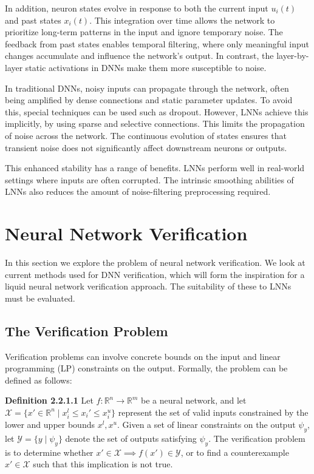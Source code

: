 In addition, neuron states evolve in response to both the current input \(u_i(t)\) and past states \(x_i(t)\). This integration over time allows the network to prioritize long-term patterns in the input and ignore temporary noise. The feedback from past states enables temporal filtering, where only meaningful input changes accumulate and influence the network’s output. In contrast, the layer-by-layer static activations in DNNs make them more susceptible to noise.

In traditional DNNs, noisy inputs can propagate through the network, often being amplified by dense connections and static parameter updates. To avoid this, special techniques can be used such as dropout. However, LNNs achieve this implicitly, by using sparse and selective connections. This limits the propagation of noise across the network. The continuous evolution of states ensures that transient noise does not significantly affect downstream neurons or outputs.

This enhanced stability has a range of benefits. LNNs perform well in real-world settings where inputs are often corrupted. The intrinsic smoothing abilities of LNNs also reduces the amount of noise-filtering preprocessing required.

\section{Neural Network Verification}

In this section we explore the problem of neural network verification. We look at current methods used for DNN verification, which will form the inspiration for a liquid neural network verification approach. The suitability of these to LNNs must be evaluated.

\subsection{The Verification Problem}

Verification problems can involve concrete bounds on the input and linear programming (LP) constraints on the output. Formally, the problem can be defined as follows:

\textbf{Definition 2.2.1.1} Let \( f : \mathbb{R}^n \to \mathbb{R}^m \) be a neural network, and let \( \mathcal{X} = \{x' \in \mathbb{R}^n \mid x_i^l \leq x_i' \leq x_i^u \} \) represent the set of valid inputs constrained by the lower and upper bounds \(x^l, x^u\). Given a set of linear constraints on the output \( \psi_y \), let \( \mathcal{Y} = \{ y \mid \psi_y \} \) denote the set of outputs satisfying \( \psi_y \). The verification problem is to determine whether \( x' \in \mathcal{X} \implies f(x') \in \mathcal{Y} \), or to find a counterexample \( x' \in \mathcal{X} \) such that this implication is not true. \label{verification_def}

